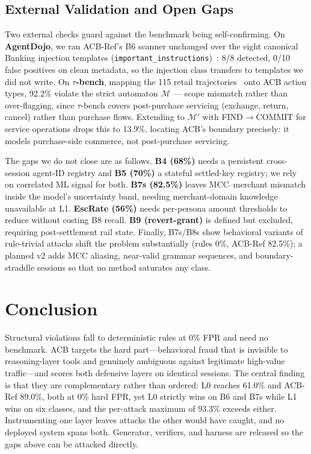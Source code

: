 \documentclass{article}
\begin{document}
\subsection{External Validation and Open Gaps}
\label{sec:cross_bench}
\label{sec:gaps}

Two external checks guard against the benchmark being self-confirming. On \textbf{AgentDojo},
we ran ACB-Ref's B6 scanner unchanged over the eight canonical Banking injection templates
(\texttt{important\_instructions})~\cite{agentdojo}: 8/8 detected, 0/10 false positives on
clean metadata, so the injection class transfers to templates we did not write. On
\textbf{$\tau$-bench}, mapping the 115 retail trajectories~\cite{taubench} onto ACB action
types, 92.2\% violate the strict automaton $\mathcal{M}$ --- scope mismatch rather than
over-flagging, since $\tau$-bench covers post-purchase servicing (exchange, return, cancel)
rather than purchase flows. Extending to $\mathcal{M}'$ with FIND$\to$COMMIT for service
operations drops this to 13.9\%, locating ACB's boundary precisely: it models purchase-side
commerce, not post-purchase servicing.

The gaps we do not close are as follows. \textbf{B4 (68\%)} needs a persistent cross-session
agent-ID registry and \textbf{B5 (70\%)} a stateful settled-key registry; we rely on
correlated ML signal for both. \textbf{B7s (82.5\%)} leaves MCC--merchant mismatch inside the
model's uncertainty band, needing merchant-domain knowledge unavailable at L1.
\textbf{EscRate (56\%)} needs per-persona amount thresholds to reduce without costing B8
recall. \textbf{B9 (revert-grant)} is defined but excluded, requiring post-settlement rail
state. Finally, B7s/B8s show behavioral variants of rule-trivial attacks shift the problem
substantially (rules 0\%, ACB-Ref 82.5\%); a planned v2 adds MCC aliasing, near-valid grammar
sequences, and boundary-straddle sessions so that no method saturates any class.

\section{Conclusion}
\label{sec:conclusion}

Structural violations fall to deterministic rules at 0\% FPR and need no benchmark. ACB
targets the hard part---behavioral fraud that is invisible to reasoning-layer tools and
genuinely ambiguous against legitimate high-value traffic---and scores both defensive layers
on identical sessions. The central finding is that they are complementary rather than
ordered: L0 reaches 61.0\% and ACB-Ref 89.0\%, both at 0\% hard FPR, yet L0 strictly wins on
B6 and B7s while L1 wins on six classes, and the per-attack maximum of 93.3\% exceeds either.
Instrumenting one layer leaves attacks the other would have caught, and no deployed system
spans both. Generator, verifiers, and harness are released so the gaps above can be attacked
directly.
\end{document}
